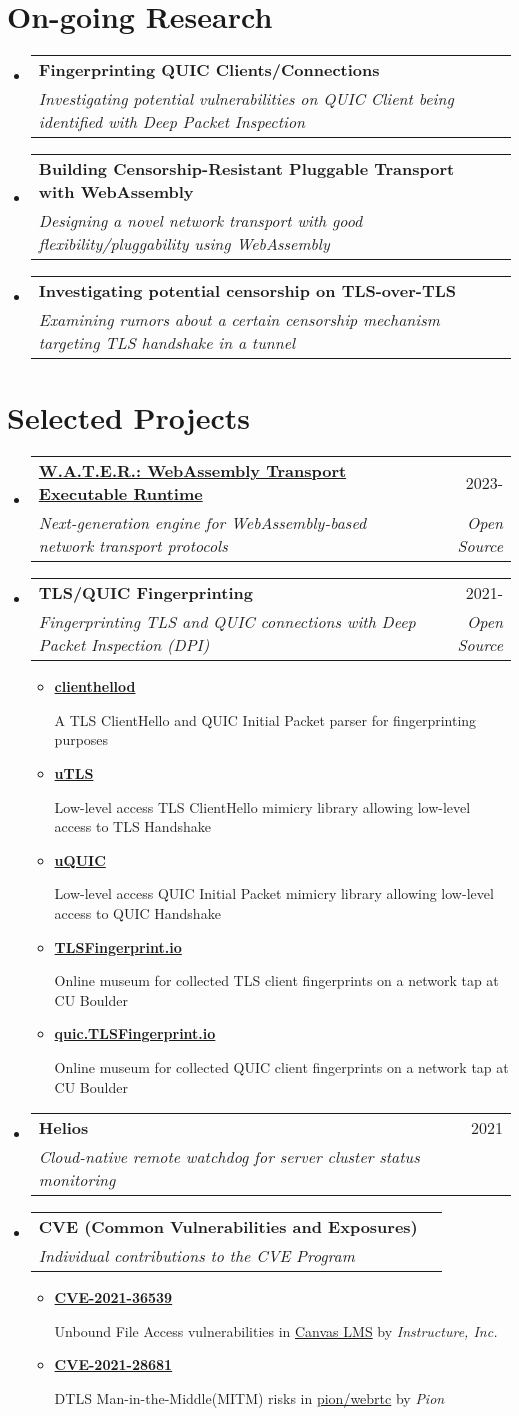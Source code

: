 \documentclass[letterpaper,11pt]{article}
\makeatletter
\newcommand{\resumeItem}[1]{
  \item\small{
    {#1 \vspace{-2pt}}
  }
}
\newcommand{\resumeSubheading}[4]{
  \vspace{-2pt}\item
    \begin{tabular*}{0.97\textwidth}[t]{l@{\extracolsep{\fill}}r}
      \textbf{#1} & #2 \\
      \textit{\small#3} & \textit{\small #4} \\
    \end{tabular*}\vspace{-7pt}
}
\newcommand{\resumeSubHeadingListStart}{\begin{itemize}[leftmargin=0.15in, label={}]}
\newcommand{\resumeSubHeadingListEnd}{\end{itemize}}
\newcommand{\resumeItemListStart}{\begin{itemize}}
\newcommand{\resumeItemListEnd}{\end{itemize}\vspace{-5pt}}
\makeatother
\begin{document}
\section{On-going Research}
\resumeSubHeadingListStart
  \resumeSubheading
  {\textbf{Fingerprinting QUIC Clients/Connections}}{}
  {Investigating potential vulnerabilities on QUIC Client being identified with Deep Packet Inspection}{}
  \resumeSubheading
  {\textbf{Building Censorship-Resistant Pluggable Transport with {WebAssembly}}}{}
  {Designing a novel network transport with good flexibility/pluggability using WebAssembly}{}
  \resumeSubheading
  {\textbf{Investigating potential censorship on TLS-over-TLS}}{}
  {Examining rumors about a certain censorship mechanism targeting TLS handshake in a tunnel}{}
\resumeSubHeadingListEnd
\vspace{1pt}

\section{Selected Projects}
\resumeSubHeadingListStart
\resumeSubheading
{\href{https://github.com/gaukas/water}{\textbf{W.A.T.E.R.: WebAssembly Transport Executable Runtime}}}{2023-}
{Next-generation engine for WebAssembly-based network transport protocols}{Open Source}
\resumeSubheading
{\textbf{TLS/QUIC Fingerprinting}}{2021-}
{Fingerprinting TLS and QUIC connections with Deep Packet Inspection (DPI)}{Open Source}
\resumeItemListStart
  \resumeItem{\href{https://github.com/gaukas/clienthellod}{\textbf{clienthellod}}}
    {A TLS ClientHello and QUIC Initial Packet parser for fingerprinting purposes}
  \resumeItem{\href{https://github.com/refraction-networking/utls}{\textbf{uTLS}}}
    {Low-level access TLS ClientHello mimicry library allowing low-level access to TLS Handshake}
  \resumeItem{\href{https://github.com/refraction-networking/uquic}{\textbf{uQUIC}}}
    {Low-level access QUIC Initial Packet mimicry library allowing low-level access to QUIC Handshake}
  \resumeItem{\href{https://tlsfingerprint.io}{\textbf{TLSFingerprint.io}}}
    {Online museum for collected TLS client fingerprints on a network tap at CU Boulder}
  \resumeItem{\href{https://quic.tlsfingerprint.io}{\textbf{quic.TLSFingerprint.io}}}
    {Online museum for collected QUIC client fingerprints on a network tap at CU Boulder}  
\resumeItemListEnd
\resumeSubheading
{\textbf{Helios}}{2021}
{Cloud-native remote watchdog for server cluster status monitoring}{}
\resumeSubheading
{\textbf{CVE (Common Vulnerabilities and Exposures)}}{}
{Individual contributions to the CVE\textsuperscript{\textregistered} Program}{}
\resumeItemListStart
  \resumeItem{\href{https://cve.mitre.org/cgi-bin/cvename.cgi?name=CVE-2021-36539}{\textbf{CVE-2021-36539}}}
    {Unbound File Access vulnerabilities in \href{https://www.instructure.com/canvas}{Canvas LMS} by \emph{Instructure, Inc.}}
  \resumeItem{\href{https://cve.mitre.org/cgi-bin/cvename.cgi?name=CVE-2021-28681}{\textbf{CVE-2021-28681}}}
    {DTLS Man-in-the-Middle(MITM) risks in \href{https://github.com/pion/webrtc}{pion/webrtc} by \emph{Pion}}
\resumeItemListEnd
\resumeSubHeadingListEnd
\vspace{1pt}
\end{document}
